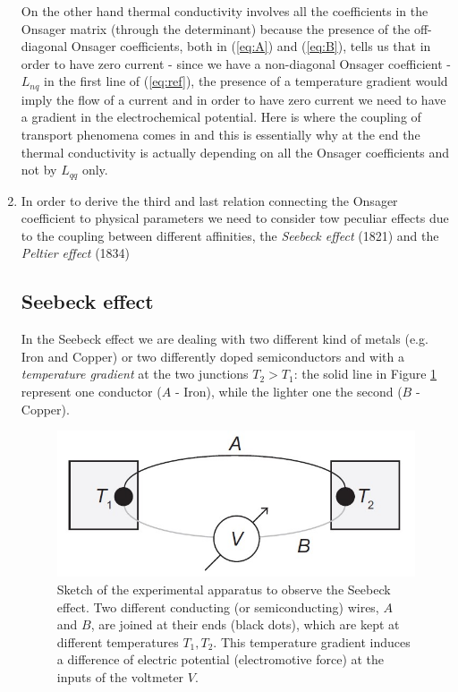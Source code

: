 \documentclass[\main/main.tex]{subfiles}
\begin{document}
\begin{enumerate}
    On the other hand thermal conductivity involves all the coefficients in the Onsager matrix (through the determinant) because the presence of the off-diagonal Onsager coefficients, both in (\ref{eq:A}) and (\ref{eq:B}), tells us that in order to have zero current - since we have a non-diagonal Onsager coefficient - $L_{nq}$ in the first line of (\ref{eq:ref}), the presence of a temperature gradient would imply the flow of a current and in order to have zero current we need to have a gradient in the electrochemical potential. Here is where the coupling of transport phenomena comes in and this is essentially why at the end the thermal conductivity is actually depending on all the Onsager coefficients and not by $L_{qq}$ only. 
    
    \item In order to derive the third and last relation connecting the Onsager coefficient to physical parameters we need to consider tow peculiar effects due to the coupling between different affinities, the \textit{Seebeck effect} (1821) and the \textit{Peltier effect} (1834)
    \subsection{Seebeck effect}
    
    In the Seebeck effect we are dealing with two different kind of metals (e.g. Iron and Copper) or two differently doped semiconductors and with a \textit{temperature gradient} at the two junctions $T_2>T_1$: the solid line in Figure \ref{fig:Seebeck} represent one conductor ($A$ - Iron), while the lighter one the second ($B$ - Copper).
    
    \begin{figure}[ht]
        \centering
        \includegraphics[width=0.7\linewidth]{Lectures/Images/seebeck.jpg}
        \caption{Sketch of the experimental apparatus to observe the Seebeck effect. Two different conducting (or semiconducting)
wires, $A$ and $B$, are joined at their ends (black dots), which are kept at different temperatures $T_1, T_2$. This temperature
gradient induces a difference of electric potential (electromotive force) at the inputs of the voltmeter $V$.}
        \label{fig:Seebeck}
    \end{figure}


\end{enumerate}
\end{document}
